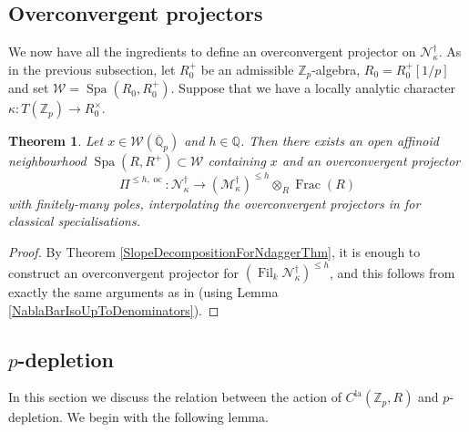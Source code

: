 \documentclass[10pt, oneside]{amsart}
\numberwithin{equation}{subsection}
\newtheorem{theorem}[equation]{Theorem}
\theoremstyle{definition}
\theoremstyle{remark}
\newcommand{\mbb}[1]{\mathbb{#1}}
\newcommand{\opn}[1]{\operatorname{#1}}
\begin{document}
\subsection{Overconvergent projectors}

We now have all the ingredients to define an overconvergent projector on $\mathscr{N}^{\dagger}_{\kappa}$. As in the previous subsection, let $R_0^+$ be an admissible $\mbb{Z}_p$-algebra, $R_0 = R_0^+[1/p]$ and set $\mathcal{W} = \opn{Spa}(R_0, R_0^+)$. Suppose that we have a locally analytic character $\kappa \colon T(\mbb{Z}_p) \to R_0^{\times}$.

\begin{theorem} \label{OCProjectorForNdaggerThm}
Let $x \in \mathcal{W}(\overline{\mbb{Q}}_p)$ and $h \in \mbb{Q}$. Then there exists an open affinoid neighbourhood $\opn{Spa}(R, R^+) \subset \mathcal{W}$ containing $x$ and an overconvergent projector
\[
\Pi^{\leq h, \opn{oc}} \colon \mathscr{N}^{\dagger}_{\kappa} \to \left(\mathscr{M}^{\dagger}_{\kappa} \right)^{\leq h} \otimes_R \opn{Frac}(R)
\]
with finitely-many poles, interpolating the overconvergent projectors in \cite[\S 3.3.4]{Urban} for classical specialisations.
\end{theorem}
\begin{proof}
By Theorem \ref{SlopeDecompositionForNdaggerThm}, it is enough to construct an overconvergent projector for $\left(\opn{Fil}_k \mathscr{N}^{\dagger}_{\kappa} \right)^{\leq h}$, and this follows from exactly the same arguments as in \cite[\S 3.9]{AI_LLL} (using Lemma \ref{NablaBarIsoUpToDenominators}).
\end{proof}

\subsection{\texorpdfstring{$p$}{p}-depletion}

In this section we discuss the relation between the action of $C^{\opn{la}}(\mbb{Z}_p, R)$ and $p$-depletion. We begin with the following lemma.
\end{document}
